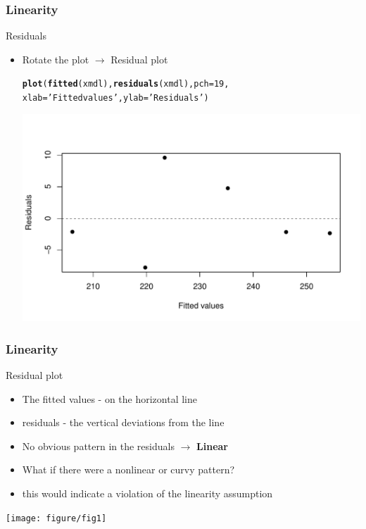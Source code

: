 \documentclass{beamer}\usepackage[]{graphicx}\usepackage[]{color}
\makeatletter
\def\maxwidth{ %
  \ifdim\Gin@nat@width>\linewidth
    \linewidth
  \else
    \Gin@nat@width
  \fi
}
\newcommand{\hlnum}[1]{\textcolor[rgb]{0.686,0.059,0.569}{#1}}%
\newcommand{\hlstr}[1]{\textcolor[rgb]{0.192,0.494,0.8}{#1}}%
\newcommand{\hlstd}[1]{\textcolor[rgb]{0.345,0.345,0.345}{#1}}%
\newcommand{\hlkwc}[1]{\textcolor[rgb]{0.333,0.667,0.333}{#1}}%
\newcommand{\hlkwd}[1]{\textcolor[rgb]{0.737,0.353,0.396}{\textbf{#1}}}%
\newenvironment{kframe}{%
 \def\at@end@of@kframe{}%
 \ifinner\ifhmode%
  \def\at@end@of@kframe{\end{minipage}}%
  \begin{minipage}{\columnwidth}%
 \fi\fi%
 \def\FrameCommand##1{\hskip\@totalleftmargin \hskip-\fboxsep
 \colorbox{shadecolor}{##1}\hskip-\fboxsep
     \hskip-\linewidth \hskip-\@totalleftmargin \hskip\columnwidth}%
 \MakeFramed {\advance\hsize-\width
   \@totalleftmargin\z@ \linewidth\hsize
   \@setminipage}}%
 {\par\unskip\endMakeFramed%
 \at@end@of@kframe}
\newenvironment{knitrout}{}{} %
\makeatother
\begin{document}
\begin{frame}[fragile]
\frametitle{Linearity}
Residuals
\begin{itemize}
\item Rotate the plot $\rightarrow$ Residual plot

\begin{knitrout}\footnotesize
{}\color{fgcolor}\begin{kframe}
\begin{alltt}
\hlkwd{plot}\hlstd{(}\hlkwd{fitted}\hlstd{(xmdl),} \hlkwd{residuals}\hlstd{(xmdl),}\hlkwc{pch}\hlstd{=}\hlnum{19}\hlstd{,}
        \hlkwc{xlab} \hlstd{=} \hlstr{'Fitted values'}\hlstd{,} \hlkwc{ylab}\hlstd{=}\hlstr{'Residuals'} \hlstd{)}
\end{alltt}
\end{kframe}
\includegraphics[width=\maxwidth]{figure/residual_plot-1} 

\end{knitrout}

\end{itemize}
\end{frame}

\begin{frame}
\frametitle{Linearity}
Residual plot
\begin{itemize}
\item The fitted values - on the horizontal line
\item residuals - the vertical deviations from the line
\item \alert{No obvious pattern} in the residuals $\rightarrow$ \textbf{Linear}
\pause
\item What if there were a nonlinear or curvy pattern?
\item this would indicate a violation of the linearity assumption
\end{itemize}
\begin{center}
\texttt{[image: figure/fig1]}
\end{center}
\end{frame}
\end{document}
